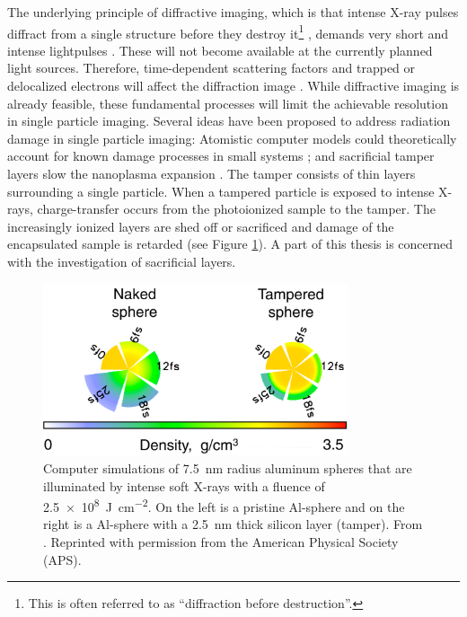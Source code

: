 The underlying principle of diffractive imaging, which is that intense X-ray pulses diffract from a single structure before they destroy it\footnote{This is often referred to as ``diffraction before destruction''.} \cite{Neutze-2000-Nature}, demands very short and intense lightpulses \cite{Huldt-2003-JSB,Hau-Riege-2005-PRE}. These will not become available at the currently planned light sources. Therefore, time-dependent scattering factors and trapped or delocalized electrons will affect the diffraction image \cite{Aquila-2015-StrucDyn}. While diffractive imaging is already feasible, these fundamental processes will limit the achievable resolution in single particle imaging. Several ideas have been proposed to address radiation damage in single particle imaging: Atomistic computer models could theoretically account for known damage processes in small systems \citep{Ho-2016-PRA,Quiney-2010-NatPhys,Yoon-2016-scirep}; and sacrificial tamper layers slow the nanoplasma expansion \citep{Hau-Riege-2004-PRE,Hau-Riege-2007-PRL,Jurek-2008-EPJ,Jurek-2009-EPL,Hau-Riege-2010-PRL,Hoener-2008-JPB}. The tamper consists of thin layers surrounding a single particle. When a tampered particle is exposed to intense X-rays, charge-transfer occurs from the photoionized sample to the tamper. The increasingly ionized layers are shed off or sacrificed and damage of the encapsulated sample is retarded (see Figure \ref{fig:tamper-layer}). A part of this thesis is concerned with the investigation of sacrificial layers.\\[1\baselineskip]
%
\begin{figure}
	\centering
		\includegraphics[width=0.80\textwidth]{images/tamper-layer.png}
	\caption[Computer simulations of aluminum spheres with tamper layers]{Computer simulations of \SI{7.5}{\nano\meter} radius aluminum spheres that are illuminated by intense soft X-rays with a fluence of \SI{2.5e8}{\joule\per\square\centi\meter}. On the left is a pristine Al-sphere and on the right is a Al-sphere with a \SI{2.5}{\nano\meter} thick silicon layer (tamper). From \citep{Hau-Riege-2010-PRL}. Reprinted with permission from the American Physical Society (APS).}
	\label{fig:tamper-layer}
\end{figure}
